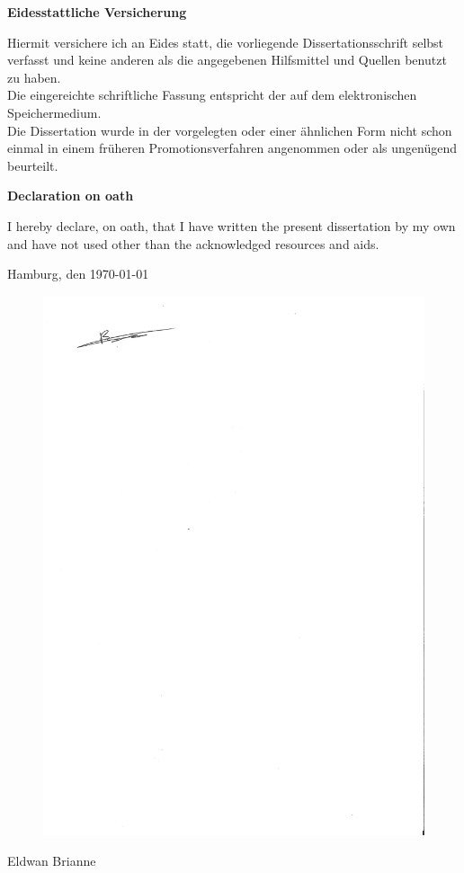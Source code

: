 \cleardoublepage
\thispagestyle{empty}

\vspace*{\fill}
\begin{flushleft}
  {\LARGE \bf Eidesstattliche Versicherung\\}
  \vspace{1cm}

  \noindent Hiermit versichere ich an Eides statt, die vorliegende Dissertationsschrift selbst verfasst und keine anderen als die angegebenen Hilfsmittel und Quellen benutzt zu haben.\\ Die eingereichte schriftliche Fassung entspricht der auf dem elektronischen Speichermedium.\\ Die Dissertation wurde in der vorgelegten oder einer \"ahnlichen Form nicht schon einmal in einem fr\"uheren Promotionsverfahren angenommen oder als ungen\"ugend beurteilt.

  \vspace{1cm}

  {\LARGE \bf Declaration on oath\\}
  \vspace{1cm}

  \noindent I hereby declare, on oath, that I have written the present dissertation by my own and have not used other than the acknowledged resources and aids.

  \vspace{1cm}

  \noindent Hamburg, den \today
  \begin{figure}[htbp!]
    \includegraphics[width=0.5\linewidth]{Signature.pdf}
  \end{figure}

  \noindent Eldwan Brianne
\end{flushleft}
\vspace*{\fill}
